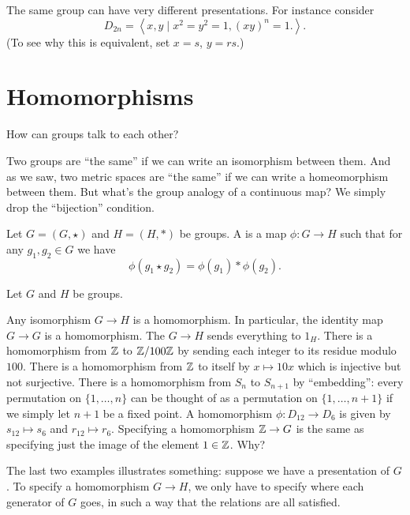 \begin{example}
	The same group can have very different presentations.
	For instance consider
	\[ D_{2n} = \left< x,y \mid x^2=y^2=1, (xy)^n=1. \right>. \]
	(To see why this is equivalent, set $x=s$, $y=rs$.)
\end{example}

\section{Homomorphisms}

How can groups talk to each other?

Two groups are ``the same'' if we can write an isomorphism between them.
And as we saw, two metric spaces are ``the same''
if we can write a homeomorphism between them.
But what's the group analogy of a continuous map?
We simply drop the ``bijection'' condition.

\begin{definition}
	Let $G = (G, \star)$ and $H = (H, \ast)$ be groups.
	A  is a map $\phi : G \to H$
	such that for any $g_1, g_2 \in G$ we have
	\[ \phi(g_1 \star g_2) = \phi(g_1) \ast \phi(g_2). \]
\end{definition}

\begin{example}
	Let $G$ and $H$ be groups.
	\begin{enumerate}[(a)]
		\ii Any isomorphism $G \to H$ is a homomorphism.
		In particular, the identity map $G \to G$ is a homomorphism.
		\ii The  $G \to H$ sends
		everything to $1_H$.
		\ii There is a homomorphism from $\mathbb Z$ to $\mathbb Z/100\mathbb Z$ by
		sending each integer to its residue modulo $100$.
		\ii There is a homomorphism from $\mathbb Z$ to itself by $x \mapsto 10x$
		which is injective but not surjective.
		\ii There is a homomorphism from $S_n$ to $S_{n+1}$ by ``embedding'':
		every permutation on $\{1,\dots,n\}$ can be thought of as a permutation
		on $\{1,\dots,n+1\}$ if we simply let $n+1$ be a fixed point.
		\ii A homomorphism $\phi: D_{12} \to D_6$
		is given by $s_{12} \mapsto s_6$
		and $r_{12} \mapsto r_6$.
		\ii Specifying a homomorphism $\mathbb Z \to G$ is the same as
		specifying just the image of the element $1 \in \mathbb Z$. Why?
	\end{enumerate}
\end{example}
The last two examples illustrates something: suppose we have a presentation of $G$.
To specify a homomorphism $G \to H$, we only have to specify where each generator of $G$ goes, in such a way that the relations are all satisfied.

